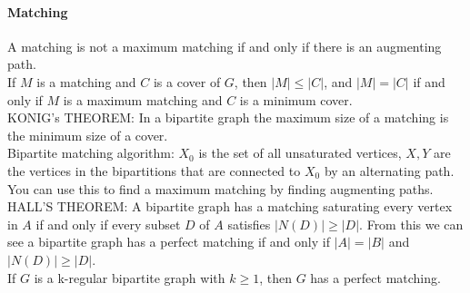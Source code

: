 \documentclass[10pt,letter]{article}
\begin{document}
\paragraph{Matching}
A matching is not a maximum matching if and only if there is an augmenting path. \\ 
If $M$ is a matching and $C$ is a cover of $G$, then $|M|\leq|C|$, and $|M|=|C|$ if and only if $M$ is a maximum matching and $C$ is a minimum cover. \\ 
KONIG's THEOREM: In a bipartite graph the maximum size of a matching is the minimum size of a cover.\\ 
Bipartite matching algorithm: $X_0$ is the set of all unsaturated vertices, $X,Y$ are the vertices in the bipartitions that are connected to $X_0$ by an alternating path. You can use this to find a maximum matching by finding augmenting paths. \\
HALL'S THEOREM: A bipartite graph has a matching saturating every vertex in $A$ if and only if every subset $D$ of $A$ satisfies $|N(D)|\geq|D|$. From this we can see a bipartite graph has a perfect matching if and only if $|A|=|B|$ and $|N(D)|\geq|D|$. \\ 
If $G$ is a k-regular bipartite graph with $k\geq1$, then $G$ has a perfect matching. \\ 
\end{document}
